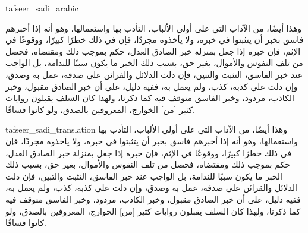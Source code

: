 \begin{taggedblock}{tafseer_sadi_arabic}
\begin{Arabic}
وهذا أيضًا، من الآداب التي على أولي الألباب، التأدب بها واستعمالها، وهو أنه إذا أخبرهم فاسق بخبر أن يتثبتوا في خبره، ولا يأخذوه مجردًا، فإن في ذلك خطرًا كبيرًا، ووقوعًا في الإثم، فإن خبره إذا جعل بمنزلة خبر الصادق العدل، حكم بموجب ذلك ومقتضاه، فحصل من تلف النفوس والأموال، بغير حق، بسبب ذلك الخبر ما يكون سببًا للندامة، بل الواجب عند خبر الفاسق، التثبت والتبين، فإن دلت الدلائل والقرائن على صدقه، عمل به وصدق، وإن دلت على كذبه، كذب، ولم يعمل به، ففيه دليل، على أن خبر الصادق مقبول، وخبر الكاذب، مردود، وخبر الفاسق متوقف فيه كما ذكرنا، ولهذا كان السلف يقبلون روايات كثير
[من]
الخوارج، المعروفين بالصدق، ولو كانوا فساقًا.
\end{Arabic}
\end{taggedblock}
\begin{taggedblock}{tafseer_sadi_translation}
وهذا أيضًا، من الآداب التي على أولي الألباب، التأدب بها واستعمالها، وهو أنه إذا أخبرهم فاسق بخبر أن يتثبتوا في خبره، ولا يأخذوه مجردًا، فإن في ذلك خطرًا كبيرًا، ووقوعًا في الإثم، فإن خبره إذا جعل بمنزلة خبر الصادق العدل، حكم بموجب ذلك ومقتضاه، فحصل من تلف النفوس والأموال، بغير حق، بسبب ذلك الخبر ما يكون سببًا للندامة، بل الواجب عند خبر الفاسق، التثبت والتبين، فإن دلت الدلائل والقرائن على صدقه، عمل به وصدق، وإن دلت على كذبه، كذب، ولم يعمل به، ففيه دليل، على أن خبر الصادق مقبول، وخبر الكاذب، مردود، وخبر الفاسق متوقف فيه كما ذكرنا، ولهذا كان السلف يقبلون روايات كثير
[من]
الخوارج، المعروفين بالصدق، ولو كانوا فساقًا.
\end{taggedblock}

\begin{comment}
Please use the following for footnotes:- Sample\footnoteQ{Text of Qur'an footnote goes here.}.
Sample\footnoteT{Text of Tafseer footnote goes here.}.
\end{comment}